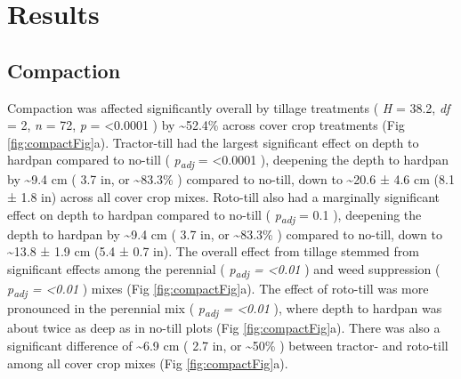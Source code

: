 \documentclass[
  12pt,
]{article}
\begin{document}
\hypertarget{results}{%
\section{Results}\label{results}}

\hypertarget{compaction}{%
\subsection{Compaction}\label{compaction}}

Compaction was affected significantly overall by tillage treatments (
\emph{H} = 38.2,
\emph{df} = 2,
\emph{n} = 72,
\emph{p} = \textless0.0001
) by
\textasciitilde52.4\%
across cover crop treatments (Fig \ref{fig:compactFig}a).
Tractor-till had the largest significant effect on depth to hardpan compared to no-till (
\emph{p\textsubscript{adj}} = \textless0.0001
),
deepening the depth to hardpan by
\textasciitilde9.4 cm (
3.7 in,
or \textasciitilde83.3\%
) compared to no-till,
down to
\textasciitilde20.6 ±
4.6 cm
(8.1 ±
1.8 in)
across all cover crop mixes.
Roto-till also had a marginally significant effect on depth to hardpan compared to no-till (
\emph{p\textsubscript{adj}} = 0.1
),
deepening the depth to hardpan by
\textasciitilde9.4 cm (
3.7 in,
or \textasciitilde83.3\%
) compared to no-till, down to
\textasciitilde13.8 ±
1.9 cm
(5.4 ±
0.7 in).
The overall effect from tillage stemmed from significant effects among the perennial (
\emph{p\textsubscript{adj} = \textless0.01}
) and weed suppression (
\emph{p\textsubscript{adj} = \textless0.01}
) mixes (Fig \ref{fig:compactFig}a).
The effect of roto-till was more pronounced in the perennial mix (
\emph{p\textsubscript{adj} = \textless0.01}
), where depth to hardpan was about twice as deep as in no-till plots (Fig \ref{fig:compactFig}a).
There was also a significant difference of
\textasciitilde6.9 cm (
2.7 in,
or \textasciitilde50\%
) between tractor- and roto-till among all cover crop mixes (Fig \ref{fig:compactFig}a).
\end{document}
